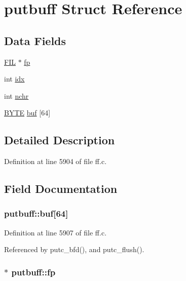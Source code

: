 \hypertarget{structputbuff}{}\section{putbuff Struct Reference}
\label{structputbuff}
\subsection*{Data Fields}
\begin{DoxyCompactItemize}
\item 
\hyperlink{structFIL}{F\+IL} $\ast$ \hyperlink{structputbuff_a5c7baa85e569be17f4888f5d92f4453c}{fp}
\item 
int \hyperlink{structputbuff_a10a3ca93af8df07e9836ebd5230c06d8}{idx}
\item 
int \hyperlink{structputbuff_a125366bfe48077e6f562f95e30b4604a}{nchr}
\item 
\hyperlink{integer_8h_a4ae1dab0fb4b072a66584546209e7d58}{B\+Y\+TE} \hyperlink{structputbuff_ae623199e5d2851f95050670170f20329}{buf} \mbox{[}64\mbox{]}
\end{DoxyCompactItemize}


\subsection{Detailed Description}


Definition at line 5904 of file ff.\+c.



\subsection{Field Documentation}
\subsubsection[{\texorpdfstring{buf}{buf}}]{ putbuff\+::buf\mbox{[}64\mbox{]}}\hypertarget{structputbuff_ae623199e5d2851f95050670170f20329}{}\label{structputbuff_ae623199e5d2851f95050670170f20329}


Definition at line 5907 of file ff.\+c.



Referenced by putc\+\_\+bfd(), and putc\+\_\+flush().

\subsubsection[{\texorpdfstring{fp}{fp}}]{$\ast$ putbuff\+::fp}\hypertarget{structputbuff_a5c7baa85e569be17f4888f5d92f4453c}{}\label{structputbuff_a5c7baa85e569be17f4888f5d92f4453c}


